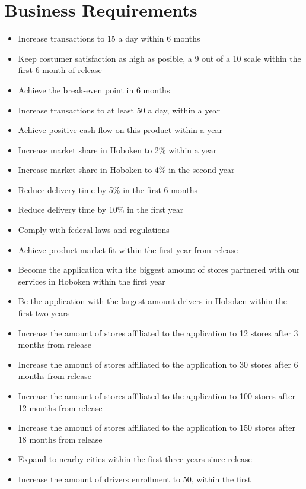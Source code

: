 \section{Business Requirements}
\begin{itemize}
    \item Increase transactions to 15 a day within 6 months
    \item Keep costumer satisfaction as high as posible, a 9 out of a 10 scale 
    within the first 6 month of release
    \item Achieve the break-even point in 6 months
    \item Increase transactions to at least 50 a day, within a year
    \item Achieve positive cash flow on this product within a year
    \item Increase market share in Hoboken to 2\% within a year
    \item Increase market share in Hoboken to 4\% in the second year
    \item Reduce delivery time by 5\% in the first 6 months
    \item Reduce delivery time by 10\% in the first year
    \item Comply with federal laws and regulations
    \item Achieve product market fit within the first year from release
    \item Become the application with the biggest amount of stores partnered 
    with our services in Hoboken within the first year
    \item Be the application with the largest amount drivers in Hoboken 
    within the first two years
    \item Increase the amount of stores affiliated to the application to 12 
    stores after 3 months from release
    \item Increase the amount of stores affiliated to the application to 30 
    stores after 6 months from release
    \item Increase the amount of stores affiliated to the application to 100 
    stores after 12 months from release
    \item Increase the amount of stores affiliated to the application to 150 
    stores after 18 months from release
    \item Expand to nearby cities within the first three years since release
    \item Increase the amount of drivers enrollment to 50, within the first 

\end{itemize}
